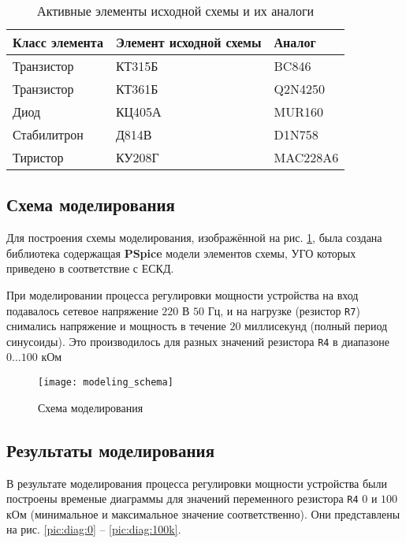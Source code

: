 \begin{table}[H]
\begin{center}
	\caption{Активные элементы исходной схемы и их аналоги}
	\label{tab:elements_analogs}
	\def\tabcolsep{10pt}
	\begin{tabular}{|l|l|l|}
		\hline
		Класс элемента &
		Элемент исходной схемы & 
		Аналог \\
		\hline
		Транзистор &
		КТ315Б &
		BC846 \\
		\hline
		Транзистор &
		КТ361Б &
		Q2N4250 \\
		\hline
		Диод &
		КЦ405А &
		MUR160 \\
		\hline
		Стабилитрон &
		Д814В &
		D1N758 \\
		\hline
		Тиристор &
		КУ208Г &
		MAC228A6 \\
		\hline
\end{tabular}
\end{center}
\end{table}

\subsection{Схема моделирования}

Для построения схемы моделирования, изображённой на рис. \ref{pic:mod_scheme}, была создана библиотека содержащая \textbf{PSpice} модели элементов схемы, УГО которых приведено  в соответствие с ЕСКД. 

При моделировании процесса регулировки мощности устройства на вход подавалось сетевое напряжение $220$ В $50$ Гц, и на нагрузке (резистор \verb+R7+) снимались напряжение и мощность в течение $20$ миллисекунд (полный период синусоиды). Это производилось для разных значений резистора \verb+R4+ в диапазоне $0\dots100$ кОм

\begin{figure}[H]
\begin{center}
	\texttt{[image: modeling\_schema]}
	\caption{Схема моделирования}
	\label{pic:mod_scheme}
\end{center}
\end{figure}

\subsection{Результаты моделирования}

В результате моделирования процесса регулировки мощности устройства были построены временые диаграммы для значений переменного резистора \verb+R4+ $0$ и $100$ кОм (минимальное и максимальное значение соответственно). Они представлены на рис. \ref{pic:diag:0} -- \ref{pic:diag:100k}.

